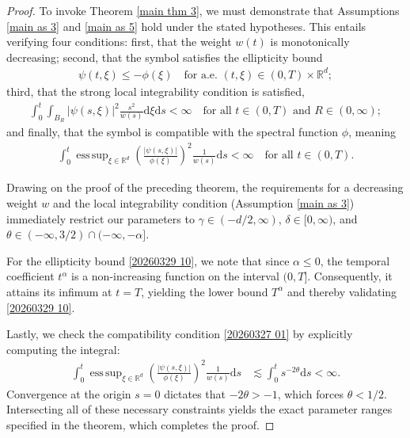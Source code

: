 \documentclass[11pt,reqno]{amsart}
\theoremstyle{definition}
\theoremstyle{remark}
\newcommand\bR{\mathbb{R}}
\DeclareMathOperator*{\esssup}{ess\,sup}
\numberwithin{equation}{section}
\begin{document}
\begin{proof}
To invoke Theorem \ref{main thm 3}, we must demonstrate that Assumptions \ref{main as 3} and \ref{main as 5} hold under the stated hypotheses. This entails verifying four conditions: first, that the weight $w(t)$ is monotonically decreasing; second, that the symbol satisfies the ellipticity bound
\begin{align}
										\label{20260329 10}
\psi(t,\xi) \leq - \phi(\xi) \quad \text{for a.e. } (t,\xi) \in (0,T) \times \bR^d;
\end{align}
third, that the strong local integrability condition is satisfied,
\begin{align*}
\int_0^t \int_{B_R} |\psi(s,\xi)|^2 \frac{s^2}{w(s)} \mathrm{d}\xi \mathrm{d}s < \infty \quad \text{for all } t \in (0,T) \text{ and } R \in (0,\infty);
\end{align*}
and finally, that the symbol is compatible with the spectral function $\phi$, meaning
\begin{align}
										\label{20260327 01} 
\int_0^t \esssup_{\xi \in \bR^d} \left( \frac{|\psi(s,\xi)|}{\phi(\xi)} \right)^2 \frac{1}{w(s)} \mathrm{d}s < \infty \quad \text{for all } t \in (0,T).
\end{align}

Drawing on the proof of the preceding theorem, the requirements for a decreasing weight $w$ and the local integrability condition (Assumption \ref{main as 3}) immediately restrict our parameters to $\gamma \in (-d/2,\infty)$, $\delta \in [0,\infty)$, and $\theta \in (-\infty, 3/2) \cap (-\infty,-\alpha]$. 

For the ellipticity bound \eqref{20260329 10}, we note that since $\alpha \leq 0$, the temporal coefficient $t^\alpha$ is a non-increasing function on the interval $(0,T]$. Consequently, it attains its infimum at $t=T$, yielding the lower bound $T^\alpha $ and thereby validating \eqref{20260329 10}.

Lastly, we check the compatibility condition \eqref{20260327 01} by explicitly computing the integral:
\begin{align*}
\int_0^t \esssup_{\xi \in \bR^d} \left( \frac{|\psi(s,\xi)|}{\phi(\xi)} \right)^2 \frac{1}{w(s)} \mathrm{d}s 
&\lesssim \int_0^t s^{-2\theta} \mathrm{d}s < \infty.
\end{align*}
Convergence at the origin $s=0$ dictates that $-2\theta > -1$, which forces $\theta < 1/2$. Intersecting all of these necessary constraints yields the exact parameter ranges specified in the theorem, which completes the proof.
\end{proof}
\end{document}
